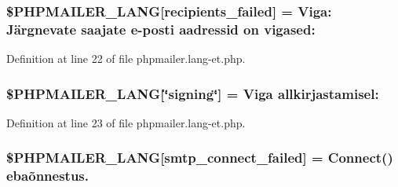 \subsubsection[{\texorpdfstring{\$\+P\+H\+P\+M\+A\+I\+L\+E\+R\+\_\+\+L\+A\+NG}{$PHPMAILER_LANG}}]{\setlength{\rightskip}{0pt plus 5cm}\$P\+H\+P\+M\+A\+I\+L\+E\+R\+\_\+\+L\+A\+NG\mbox{[}\textquotesingle{}recipients\+\_\+failed\textquotesingle{}\mbox{]} =  Viga\+: Järgnevate saajate {\bf e}-\/posti aadressid {\bf on} vigased\+: \textquotesingle{}}\hypertarget{phpmailer_8lang-et_8php_a7589d30bb9b368327c2df015f3e6bcba}{}\label{phpmailer_8lang-et_8php_a7589d30bb9b368327c2df015f3e6bcba}


Definition at line 22 of file phpmailer.\+lang-\/et.\+php.

\subsubsection[{\texorpdfstring{\$\+P\+H\+P\+M\+A\+I\+L\+E\+R\+\_\+\+L\+A\+NG}{$PHPMAILER_LANG}}]{\setlength{\rightskip}{0pt plus 5cm}\$P\+H\+P\+M\+A\+I\+L\+E\+R\+\_\+\+L\+A\+NG\mbox{[}\char`\"{}signing\char`\"{}\mbox{]} = \textquotesingle{}Viga allkirjastamisel\+: \textquotesingle{}}\hypertarget{phpmailer_8lang-et_8php_a30009d02935bb1683b9610dab63b8f6b}{}\label{phpmailer_8lang-et_8php_a30009d02935bb1683b9610dab63b8f6b}


Definition at line 23 of file phpmailer.\+lang-\/et.\+php.

\subsubsection[{\texorpdfstring{\$\+P\+H\+P\+M\+A\+I\+L\+E\+R\+\_\+\+L\+A\+NG}{$PHPMAILER_LANG}}]{\setlength{\rightskip}{0pt plus 5cm}\$P\+H\+P\+M\+A\+I\+L\+E\+R\+\_\+\+L\+A\+NG\mbox{[}\textquotesingle{}smtp\+\_\+connect\+\_\+failed\textquotesingle{}\mbox{]} =  Connect() ebaõnnestus.\textquotesingle{}}\hypertarget{phpmailer_8lang-et_8php_a7b321d4ca1e9df702403ed4c61aa0980}{}\label{phpmailer_8lang-et_8php_a7b321d4ca1e9df702403ed4c61aa0980}


